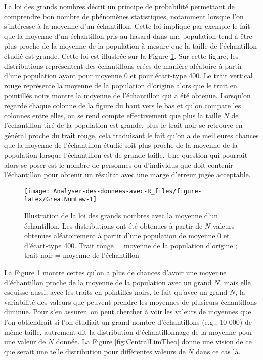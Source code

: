 \documentclass[
  french,
]{book}
\begin{document}
La loi des grands nombres décrit un principe de probabilité permettant de comprendre bon nombre de phénomènes statistiques, notamment lorsque l'on s'intéresse à la moyenne d'un échantillon. Cette loi implique par exemple le fait que la moyenne d'un échantillon pris au hasard dans une population tend à être plus proche de la moyenne de la population à mesure que la taille de l'échantillon étudié est grande. Cette loi est illustrée sur la Figure \ref{fig:GreatNumLaw}. Sur cette figure, les distributions représentent des échantillons crées de manière aléatoire à partir d'une population ayant pour moyenne 0 et pour écart-type 400. Le trait vertical rouge représente la moyenne de la population d'origine alors que le trait en pointillés noirs montre la moyenne de l'échantillon qui a été obtenue. Lorsqu'on regarde chaque colonne de la figure du haut vers le bas et qu'on compare les colonnes entre elles, on se rend compte effectivement que plus la taille \(N\) de l'échantillon tiré de la population est grande, plus le trait noir se retrouve en général proche du trait rouge, cela traduisant le fait qu'on a de meilleures chances que la moyenne de l'échantillon étudié soit plus proche de la moyenne de la population lorsque l'échantillon est de grande taille. Une question qui pourrait alors se poser est le nombre de personnes ou d'individus que doit contenir l'échantillon pour obtenir un résultat avec une marge d'erreur jugée acceptable.

\begin{figure}

{\centering \texttt{[image: Analyser-des-données-avec-R\_files/figure-latex/GreatNumLaw-1]} 

}

\caption{Illustration de la loi des grands nombres avec la moyenne d'un échantillon. Les distributions ont été obtenues à partir de $N$ valeurs obtenues aléatoirement à partir d'une population de moyenne 0 et d'écart-type 400. Trait rouge = moyenne de la population d'origine ; trait noir = moyenne de l'échantillon}\label{fig:GreatNumLaw}
\end{figure}

La Figure \ref{fig:GreatNumLaw} montre certes qu'on a plus de chances d'avoir une moyenne d'échantillon proche de la moyenne de la population avec un grand \(N\), mais elle esquisse aussi, avec les traits en pointillés noirs, le fait qu'avec un grand \(N\), la variabilité des valeurs que peuvent prendre les moyennes de plusieurs échantillons diminue. Pour s'en assurer, on peut chercher à voir les valeurs de moyennes que l'on obtiendrait si l'on étudiait un grand nombre d'échantillons (e.g., 10 000) de même taille, autrement dit la distribution d'échantillonnage de la moyenne pour une valeur de \(N\) donnée. La Figure \ref{fig:CentralLimTheo} donne une vision de ce que serait une telle distribution pour différentes valeurs de \(N\) dans ce cas là.
\end{document}
